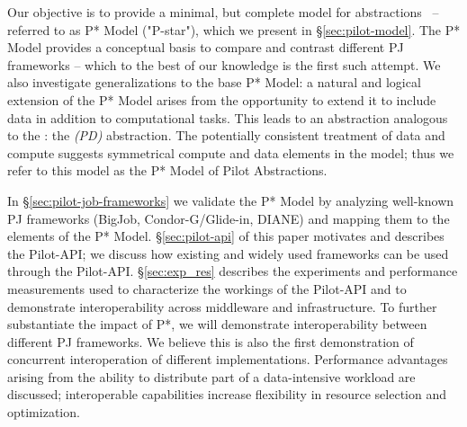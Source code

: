 \documentclass[conference]{IEEEtran}
\begin{document}



Our objective is to provide a minimal, but complete model for \pilot
abstractions~\cite{pstar-2012} -- referred to as P* Model ("P-star"),
which we present in \S\ref{sec:pilot-model}. The P* Model provides a
conceptual basis to compare and contrast different PJ frameworks --
which to the best of our knowledge is the first such attempt.  We also
investigate generalizations to the base P* Model: a natural and
logical extension of the P* Model arises from the opportunity to
extend it to include data in addition to computational tasks. This
leads to an abstraction analogous to the \pilotjob: the
\emph{\pilotdata (PD)} abstraction. The potentially consistent
treatment of data and compute suggests symmetrical compute and data
elements in the model; thus we refer to this model as the P* Model of
Pilot Abstractions.


In \S\ref{sec:pilot-job-frameworks} we validate the P* Model by
analyzing well-known PJ frameworks (BigJob, Condor-G/Glide-in, DIANE)
and mapping them to the elements of the P* Model.
\S\ref{sec:pilot-api} of this paper motivates
and describes the Pilot-API; we discuss how existing and widely used
\pilotjob frameworks can be used through the
Pilot-API. \S\ref{sec:exp_res} describes the experiments and
performance measurements used to characterize the workings of the
Pilot-API and to demonstrate interoperability across middleware and
infrastructure. %
To further substantiate the impact of P*, we will demonstrate
interoperability between different PJ frameworks. %
We believe this is also the first demonstration of concurrent
interoperation of different \pilotjob implementations. Performance
advantages arising from the ability to distribute part of a
data-intensive workload are discussed; interoperable capabilities
increase flexibility in resource selection and optimization.
\end{document}
